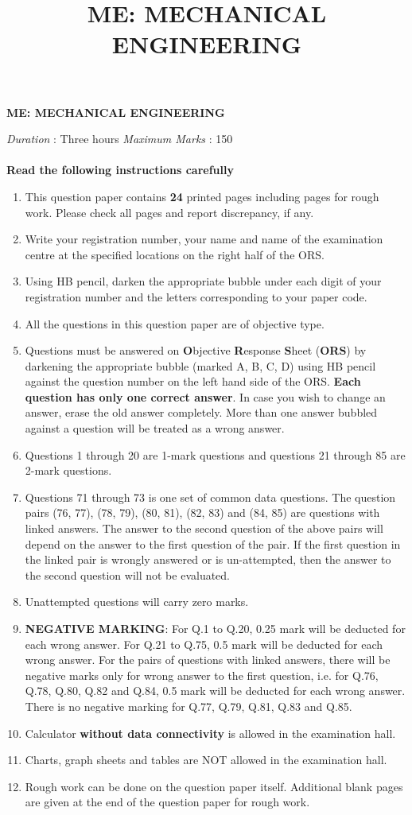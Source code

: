 \documentclass[addpoints,10pt]{exam}
\title{ME: MECHANICAL ENGINEERING}
\begin{document}
\begin{center}
    \Large
    \textbf{ME: MECHANICAL ENGINEERING}
\end{center}

\textit{Duration} : Three hours
\hfill
\textit{Maximum Marks} : 150
\\\\
\textbf{Read the following instructions carefully}
\begin{enumerate}
    \item This question paper contains \textbf{24} printed pages including pages for rough work. Please check all pages and report discrepancy, if any.
    \item Write your registration number, your name and name of the examination centre at the specified locations on the right half of the ORS.
    \item Using HB pencil, darken the appropriate bubble under each digit of your registration number and the letters corresponding to your paper code.
    \item All the questions in this question paper are of objective type.
    \item Questions must be answered on \textbf{O}bjective \textbf{R}esponse \textbf{S}heet (\textbf{ORS}) by darkening the appropriate bubble (marked A, B, C, D) using HB pencil against the question number on the left hand side of the ORS. \textbf{Each question has only one correct answer}. In case you wish to change an answer, erase the old answer completely. More than one answer bubbled against a question will be treated as a wrong answer.
    \item Questions 1 through 20 are 1-mark questions and questions 21 through 85 are 2-mark questions.
    \item Questions 71 through 73 is one set of common data questions. The question pairs (76, 77), (78, 79), (80, 81), (82, 83) and (84, 85) are questions with linked answers. The answer to the second question of the above pairs will depend on the answer to the first question of the pair. If the first question in the linked pair is wrongly answered or is un-attempted, then the answer to the second question will not be evaluated.
    \item Unattempted questions will carry zero marks.
    \item \textbf{NEGATIVE MARKING}: For Q.1 to Q.20, 0.25 mark will be deducted for each wrong answer. For Q.21 to Q.75, 0.5 mark will be deducted for each wrong answer. For the pairs of questions with linked answers, there will be negative marks only for wrong answer to the first question, i.e. for Q.76, Q.78, Q.80, Q.82 and Q.84, 0.5 mark will be deducted for each wrong answer. There is no negative marking for Q.77, Q.79, Q.81, Q.83 and Q.85.
    \item Calculator \textbf{without data connectivity} is allowed in the examination hall.
    \item Charts, graph sheets and tables are NOT allowed in the examination hall.
    \item Rough work can be done on the question paper itself. Additional blank pages are given at the end of the question paper for rough work.
\end{enumerate}
\newpage
\end{document}

